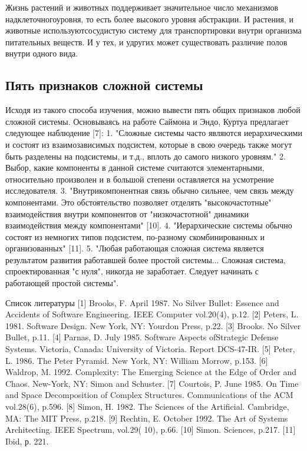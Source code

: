 \documentclass[10pt]{article}
\begin{document}
Жизнь растений и животных поддерживает значительное число механизмов надклеточного\linebreak уровня, то есть более высокого уровня абстракции. И растения, и животные используют\linebreak сосудистую систему для транспортировки внутри организма питательных веществ. И у тех, и у\linebreak других может существовать различие полов внутри одного вида.
 
\subsection{Пять признаков сложной системы}
Исходя из такого способа изучения, можно вывести пять общих признаков любой сложной системы. Основываясь на работе Саймона и Эндо, Куртуа предлагает следующее наблюдение [7]: 
1. "Сложные системы часто являются иерархическими и состоят из взаимозависимых подсистем, которые в свою очередь также могут быть разделены на подсистемы, и т.д., вплоть до самого низкого уровням." 
2. Выбор, какие компоненты в данной системе считаются элементарными, относительно произволен и в большой степени оставляется на усмотрение исследователя. 
3. "Внутрикомпонентная связь обычно сильнее, чем связь между компонентами. Это обстоятельство позволяет отделять "высокочастотные" взаимодействия внутри компонентов от "низкочастотной" динамики взаимодействия между компонентами" [10]. 
4. "Иерархические системы обычно состоят из немногих типов подсистем, по-разному скомбинированных и организованных" [11]. 
5. "Любая работающая сложная система является результатом развития работавшей более простой системы... Сложная система, спроектированная "с нуля", никогда не заработает. Следует начинать с работающей простой системы". 

Список литературы
[1] Brooks, F. April 1987. No Silver Bullet: Essence and Accidents of Software Engineering. IEEE Computer vol.20(4), p.12. 
[2] Peters, L. 1981. Software Design. New York, NY: Yourdon Press, p.22. 
[3] Brooks. No Silver Bullet, p.11. 
[4] Parnas, D. July 1985. Software Aspects ofStrategic Defense Systems. Victoria, Canada: University of Victoria. Report DCS-47-IR. 
[5] Peter, L. 1986. The Peter Pyramid. New York, NY: William Morrow, p.153. 
[6] Waldrop, M. 1992. Complexity: The Emerging Science at the Edge of Order and Chaos. New-York, NY: Simon and Schuster. 
[7] Courtois, P. June 1985. On Time and Space Decomposition of Complex Structures. Communications of the ACM vol.28(6), p.596. 
[8] Simon, H. 1982. The Sciences of the Artificial. Cambridge, MA: The MIT Press, p.218. 
[9] Rechtin, E. October 1992. The Art of Systems Architecting. IEEE Spectrum, vol.29( 10), p.66. 
[10] Simon. Sciences, p.217. 
[11] Ibid, р. 221. 
\end{document}

